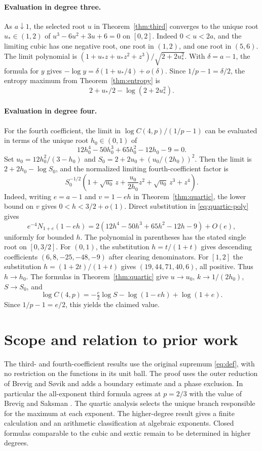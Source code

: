 \documentclass[11pt]{article}
\begin{document}
\paragraph{Evaluation in degree three.}
As \(a\downarrow1\), the selected root \(u\) in Theorem~\ref{thm:third}
converges to the unique root \(u_*\in(1,2)\) of
\(u^3-6u^2+3u+6=0\) on \([0,2]\).
Indeed \(0<u<2a\), and the limiting cubic has one negative root,
one root in \((1,2)\), and one root in \((5,6)\).
The limit polynomial is
\((1+u_*z+u_*z^2+z^3)/\sqrt{2+2u_*^2}\).
With \(\delta=a-1\), the formula for \(y\) gives
\(-\log y=\delta(1+u_*/4)+o(\delta)\).
Since \(1/p-1=\delta/2\), the entropy maximum from
Theorem~\ref{thm:entropy} is
\[
 2+u_*/2-\log(2+2u_*^2).
\]

\paragraph{Evaluation in degree four.}
For the fourth coefficient, the limit in
\(\log C(4,p)/(1/p-1)\) can be evaluated in terms of the unique
root \(h_0\in(0,1)\) of
\[
 12h_0^4-50h_0^3+65h_0^2-12h_0-9=0.
\]
Set \(u_0=12h_0^2/(3-h_0)\) and \(S_0=2+2u_0+(u_0/(2h_0))^2\).
Then the limit is \(2+2h_0-\log S_0\), and the normalized limiting
fourth-coefficient factor is
\[
 S_0^{-1/2}
 \left(1+\sqrt{u_0}\,z+\frac{u_0}{2h_0}z^2+\sqrt{u_0}\,z^3+z^4\right).
\]
Indeed, writing \(e=a-1\) and \(v=1-eh\) in Theorem~\ref{thm:quartic},
the lower bound on \(v\) gives \(0<h<3/2+o(1)\).
Direct substitution in \eqref{eq:quartic-poly} gives
\[
 e^{-4}N_{1+e}(1-eh)=
 2(12h^4-50h^3+65h^2-12h-9)+O(e),
\]
uniformly for bounded \(h\). The polynomial in parentheses has the
stated single root on \([0,3/2]\). For \((0,1)\), the substitution
\(h=t/(1+t)\) gives descending coefficients
\((6,8,-25,-48,-9)\) after clearing denominators. For \([1,2]\)
the substitution \(h=(1+2t)/(1+t)\) gives
\((19,44,71,40,6)\), all positive.
Thus \(h\to h_0\). The formulas in Theorem~\ref{thm:quartic} give
\(u\to u_0\), \(k\to1/(2h_0)\), \(S\to S_0\), and
\[
 \log C(4,p)=-\tfrac e2\log S-\log(1-eh)+\log(1+e).
\]
Since \(1/p-1=e/2\), this yields the claimed value.

\section{Scope and relation to prior work}

The third- and fourth-coefficient results use the original supremum
\eqref{eq:def}, with no restriction on the functions in its unit
ball. The proof uses the outer reduction of Brevig and S{\o}vik
\cite{BrevigSovik} and adds a boundary estimate and a phase
exclusion. In particular the all-exponent third formula agrees
at \(p=2/3\) with the value of Brevig and Saksman \cite{BrevigSaksman}.
The quartic analysis selects the unique branch responsible for the
maximum at each exponent. The higher-degree result gives a finite
calculation and an arithmetic classification at algebraic
exponents. Closed formulas comparable to the cubic and sextic
remain to be determined in higher degrees.
\end{document}
